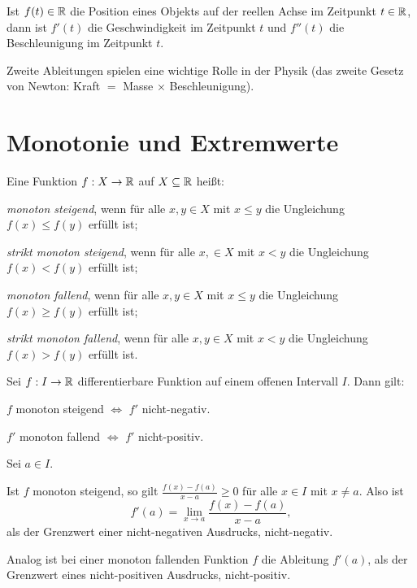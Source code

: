 \begin{bem} 
	Ist $f(t) \in \mathbb{R}$ die Position eines Objekts auf der reellen Achse im Zeitpunkt $t \in \mathbb{R}$, dann ist $f'(t)$ die Geschwindigkeit im Zeitpunkt $t$ und $f''(t)$ die Beschleunigung im Zeitpunkt $t$. 
	
	Zweite Ableitungen spielen eine wichtige Rolle in der Physik (das zweite Gesetz von Newton: Kraft $=$ Masse $\times$ Beschleunigung). 
\end{bem} 

\section{Monotonie und Extremwerte} 

\begin{defn}
	Eine Funktion $f : X \to \mathbb{R}$ auf $X \subseteq \mathbb{R}$ heißt: 
	\begin{enuma}
		\item \emph{monoton steigend}, wenn für alle $x, y \in X$ mit $x \le y$ die Ungleichung $f(x) \le f(y)$ erfüllt ist; 
		\item \emph{strikt monoton steigend}, wenn für alle $x, \in X$ mit $x<y$ die Ungleichung $f(x)<f(y)$ erfüllt ist;
		\item \emph{monoton fallend}, wenn für alle $x,y \in X$ mit $x \le y$ die Ungleichung $f(x) \ge f(y)$ erfüllt ist;
		\item \emph{strikt monoton fallend}, wenn für alle $x, y \in X$ mit $x<y$ die Ungleichung $f(x)> f(y)$ erfüllt ist. 
	\end{enuma} 
\end{defn} 

\begin{thm} Sei $f: I \to \mathbb{R}$ differentierbare Funktion auf einem offenen Intervall $I$. Dann gilt: 
	\begin{enuma} 
		\item $f$ monoton steigend $\Leftrightarrow$ $f'$ nicht-negativ.
		\item $f'$ monoton fallend $\Leftrightarrow$ $f'$ nicht-positiv. 
	\end{enuma} 
\end{thm} 

\begin{bem}
	Sei $a \in I$. 
	
	Ist $f$ monoton steigend, so gilt $\frac{f(x) - f(a)}{x-a} \ge 0$ für alle $x \in I$ mit $x \ne a$. Also ist
	\[
		f'(a) = \lim_{x \to a} \frac{f(x) - f(a)}{x-a},
	\]
	als der Grenzwert einer nicht-negativen Ausdrucks, nicht-negativ. 
	
	Analog ist bei einer monoton fallenden Funktion $f$ die Ableitung $f'(a)$, als der Grenzwert eines nicht-positiven Ausdrucks, nicht-positiv. 
\end{bem} 


